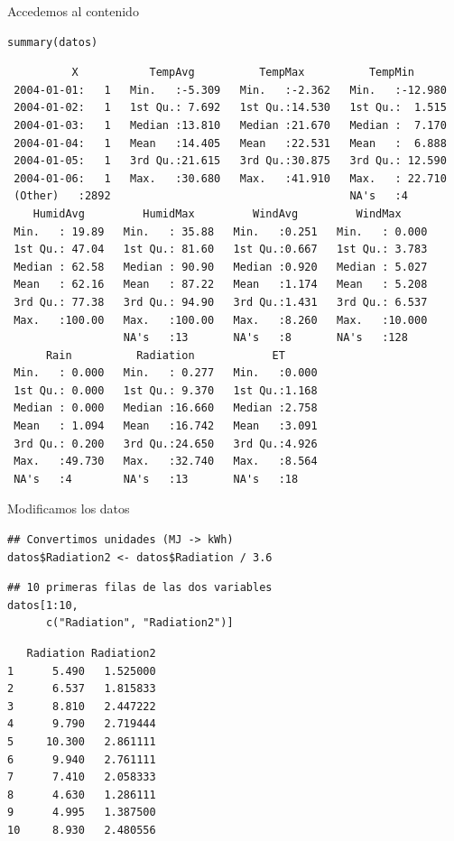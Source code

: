 \documentclass[xcolor={usenames,svgnames,dvipsnames}]{beamer}
\begin{document}
\begin{frame}[fragile,label={sec:org7cd0940}]{Accedemos al contenido}
 \lstset{language=r,label= ,caption= ,captionpos=b,numbers=none}
\begin{lstlisting}
summary(datos)
\end{lstlisting}

\begin{verbatim}
          X           TempAvg          TempMax          TempMin       
 2004-01-01:   1   Min.   :-5.309   Min.   :-2.362   Min.   :-12.980  
 2004-01-02:   1   1st Qu.: 7.692   1st Qu.:14.530   1st Qu.:  1.515  
 2004-01-03:   1   Median :13.810   Median :21.670   Median :  7.170  
 2004-01-04:   1   Mean   :14.405   Mean   :22.531   Mean   :  6.888  
 2004-01-05:   1   3rd Qu.:21.615   3rd Qu.:30.875   3rd Qu.: 12.590  
 2004-01-06:   1   Max.   :30.680   Max.   :41.910   Max.   : 22.710  
 (Other)   :2892                                     NA's   :4        
    HumidAvg         HumidMax         WindAvg         WindMax      
 Min.   : 19.89   Min.   : 35.88   Min.   :0.251   Min.   : 0.000  
 1st Qu.: 47.04   1st Qu.: 81.60   1st Qu.:0.667   1st Qu.: 3.783  
 Median : 62.58   Median : 90.90   Median :0.920   Median : 5.027  
 Mean   : 62.16   Mean   : 87.22   Mean   :1.174   Mean   : 5.208  
 3rd Qu.: 77.38   3rd Qu.: 94.90   3rd Qu.:1.431   3rd Qu.: 6.537  
 Max.   :100.00   Max.   :100.00   Max.   :8.260   Max.   :10.000  
                  NA's   :13       NA's   :8       NA's   :128     
      Rain          Radiation            ET       
 Min.   : 0.000   Min.   : 0.277   Min.   :0.000  
 1st Qu.: 0.000   1st Qu.: 9.370   1st Qu.:1.168  
 Median : 0.000   Median :16.660   Median :2.758  
 Mean   : 1.094   Mean   :16.742   Mean   :3.091  
 3rd Qu.: 0.200   3rd Qu.:24.650   3rd Qu.:4.926  
 Max.   :49.730   Max.   :32.740   Max.   :8.564  
 NA's   :4        NA's   :13       NA's   :18
\end{verbatim}
\end{frame}

\begin{frame}[fragile,label={sec:org8bc9307}]{Modificamos los datos}
 \lstset{language=r,label= ,caption= ,captionpos=b,numbers=none}
\begin{lstlisting}
## Convertimos unidades (MJ -> kWh)
datos$Radiation2 <- datos$Radiation / 3.6
\end{lstlisting}

\lstset{language=r,label= ,caption= ,captionpos=b,numbers=none}
\begin{lstlisting}
## 10 primeras filas de las dos variables
datos[1:10,
      c("Radiation", "Radiation2")]
\end{lstlisting}

\begin{verbatim}
   Radiation Radiation2
1      5.490   1.525000
2      6.537   1.815833
3      8.810   2.447222
4      9.790   2.719444
5     10.300   2.861111
6      9.940   2.761111
7      7.410   2.058333
8      4.630   1.286111
9      4.995   1.387500
10     8.930   2.480556
\end{verbatim}
\end{frame}
\end{document}
